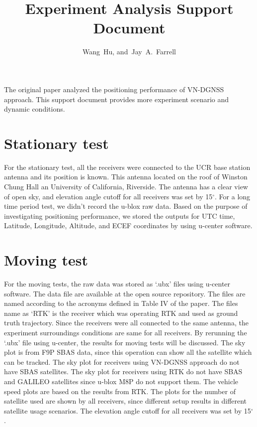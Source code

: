 \documentclass[letterpaper, 10 pt,onecolumn]{article}
\begin{document}
	\title{Experiment Analysis Support Document}
	\author{Wang~Hu,
		and~Jay~A.~Farrell
	}
	\maketitle
	
	The original paper analyzed the positioning performance of VN-DGNSS approach. This support document provides more experiment scenario and dynamic conditions. 
	
	\section{Stationary test}
	For the stationary test, all the receivers were connected to the UCR base station antenna and its position is known. This antenna located on the roof of Winston Chung Hall an University of California, Riverside. The antenna has a clear view of open sky, and elevation angle cutoff for all receivers was set by 15$^\circ$. For a long time period test, we didn't record the u-blox raw data. Based on the purpose of investigating positioning performance, we stored the outputs for UTC time, Latitude, Longitude, Altitude, and ECEF coordinates by using u-center software.
	
	\section{Moving test}
	For the moving tests, the raw data was stored as `.ubx' files using u-center software. The data file are available at the open source repository. The files are named according to the acronyms defined in Table IV of the paper. The files name as `RTK' is the receiver which was operating RTK and used as ground truth trajectory. Since the receivers were all connected to the same antenna, the experiment surroundings conditions are same for all receivers. By rerunning the `.ubx' file using u-center, the results for moving tests will be discussed. The sky plot is from F9P SBAS data, since this operation can show all the satellite which can be tracked. The sky plot for receivers using VN-DGNSS approach do not have SBAS satellites. The sky plot for receivers using RTK do not have SBAS and GALILEO satellites since u-blox M8P do not support them. The vehicle speed plots are based on the results from RTK. The plots for the number of satellite used are shown by all receivers, since different setup results in different satellite usage scenarios. The elevation angle cutoff for all receivers was set by 15$^\circ$.
	
\end{document}

